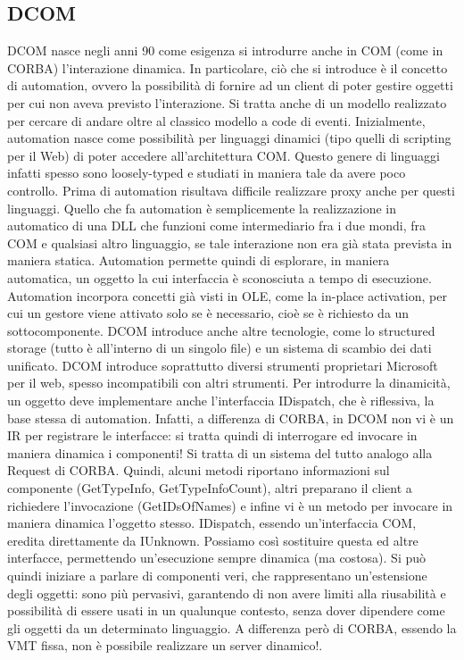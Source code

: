 \subsection{DCOM}
DCOM nasce negli anni 90 come esigenza si introdurre anche in COM (come in CORBA) l'interazione dinamica. In
particolare, ciò che si introduce è il concetto di automation, ovvero la possibilità di fornire ad un client di poter
gestire oggetti per cui non aveva previsto l'interazione. Si tratta anche di un modello realizzato per cercare di andare
oltre al classico modello a code di eventi.
Inizialmente, automation nasce come possibilità per linguaggi dinamici (tipo quelli di scripting per il Web) di poter
accedere all'architettura COM. Questo genere di linguaggi infatti spesso sono loosely-typed e studiati in maniera tale
da avere poco controllo. Prima di automation risultava difficile realizzare proxy anche per questi linguaggi.
Quello che fa automation è semplicemente la realizzazione in automatico di una DLL che funzioni come intermediario fra i
due mondi, fra COM e qualsiasi altro linguaggio, se tale interazione non era già stata prevista in maniera statica.
Automation permette quindi di esplorare, in maniera automatica, un oggetto la cui interfaccia è sconosciuta a tempo di
esecuzione. Automation incorpora concetti già visti in OLE, come la in-place activation, per cui un gestore viene
attivato solo se è necessario, cioè se è richiesto da un sottocomponente. DCOM introduce anche altre tecnologie, come lo
structured storage (tutto è all'interno di un singolo file) e un sistema di scambio dei dati unificato. DCOM introduce
soprattutto diversi strumenti proprietari Microsoft per il web, spesso incompatibili con altri strumenti.
Per introdurre la dinamicità, un oggetto deve implementare anche l'interfaccia IDispatch, che è riflessiva, la base
stessa di automation. Infatti, a differenza di CORBA, in DCOM non vi è un IR per registrare le interfacce: si tratta
quindi di interrogare ed invocare in maniera dinamica i componenti! Si tratta di un sistema del tutto analogo alla
Request di CORBA.
Quindi, alcuni metodi riportano informazioni sul componente (GetTypeInfo, GetTypeInfoCount), altri preparano il client a
richiedere l'invocazione (GetIDsOfNames) e infine vi è un metodo per invocare in maniera dinamica l'oggetto stesso.
IDispatch, essendo un'interfaccia COM, eredita direttamente da IUnknown. Possiamo così sostituire questa ed altre
interfacce, permettendo un'esecuzione sempre dinamica (ma costosa).
Si può quindi iniziare a parlare di componenti veri, che rappresentano un'estensione degli oggetti: sono più pervasivi,
garantendo di non avere limiti alla riusabilità e possibilità di essere usati in un qualunque contesto, senza dover
dipendere come gli oggetti da un determinato linguaggio.
A differenza però di CORBA, essendo la VMT fissa, non è possibile realizzare un server dinamico!.

